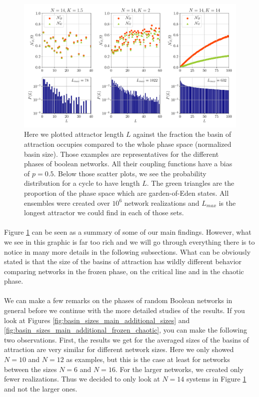 \paragraph*{}
\begin{figure}[t]
	\includegraphics[width=\textwidth]{Plots/basin_sizes_N14}
	\caption{Here we plotted attractor length $ L $ against the fraction the basin of attraction occupies compared to the whole phase space (normalized basin size). Those examples are representatives for the different phases of boolean networks. All their coupling functions have a bias of $ p = 0.5 $. Below those scatter plots, we see the probability distribution for a cycle to have length $ L $. The green triangles are the proportion of the phase space which are garden-of-Eden states. All ensembles were created over $ 10^6 $ network realizations and $ L_{max} $ is the longest attractor we could find in each of those sets.}
	\label{fig:basin_sizes_main}
\end{figure}

\paragraph*{}
Figure \ref{fig:basin_sizes_main} can be seen as a summary of some of our main findings. However, what we see in this graphic is far too rich and we will go through everything there is to notice in many more details in the following subsections. What can be obviously stated is that the size of the basins of attraction has wildly different behavior comparing networks in the frozen phase, on the critical line and in the chaotic phase.

\paragraph*{}
We can make a few remarks on the phases of random Boolean networks in general before we continue with the more detailed studies of the results. If you look at Figures \ref{fig:basin_sizes_main_additional_sizes} and \ref{fig:basin_sizes_main_additional_frozen_chaotic}, you can make the following two observations. First, the results we get for the averaged sizes of the basins of attraction are very similar for different network sizes. Here we only showed $N=10$ and $N=12$ as examples, but this is the case at least for networks between the sizes $N=6$ and $N=16$. For the larger networks, we created only fewer realizations. Thus we decided to only look at $N=14$ systems in Figure \ref{fig:basin_sizes_main} and not the larger ones.

